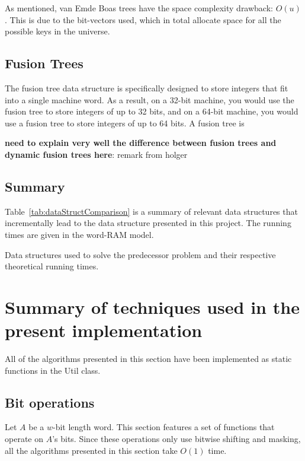 As mentioned, van Emde Boas trees have the space complexity drawback: $O(u)$. This is due to the bit-vectors used, which in total allocate space for all the possible keys in the universe.

\subsection{Fusion Trees}

The fusion tree data structure is specifically designed to store integers that fit into a single machine word. As a result, on a 32-bit machine, you would use the fusion tree to store integers of up to 32 bits, and on a 64-bit machine, you would use a fusion tree to store integers of up to 64 bits.
A fusion tree is 

\textbf{need to explain very well the difference between fusion trees and dynamic fusion trees here}: remark from holger

\subsection{Summary}

Table~\ref{tab:dataStructComparison} is a summary of relevant data structures that incrementally lead to the data structure presented in this project. The running times are given in the word-RAM model.

\begin{table}[H]
\centering

\caption[Data structure comparison]{Data structures used to solve the predecessor problem and their respective theoretical running times.}
\label{tab:dataStructComparison}
\end{table}

\newpage
\section{Summary of techniques used in the present implementation} \label{sec:summaryOfTechniques}

All of the algorithms presented in this section have been implemented as static functions in the {\ttfamily Util} class.

\subsection{Bit operations} \label{sec:bit}

Let $A$ be a $w$-bit length word. This section features a set of functions that operate on $A$'s bits. Since these operations only use bitwise shifting and masking, all the algorithms presented in this section take $O(1)$ time.

